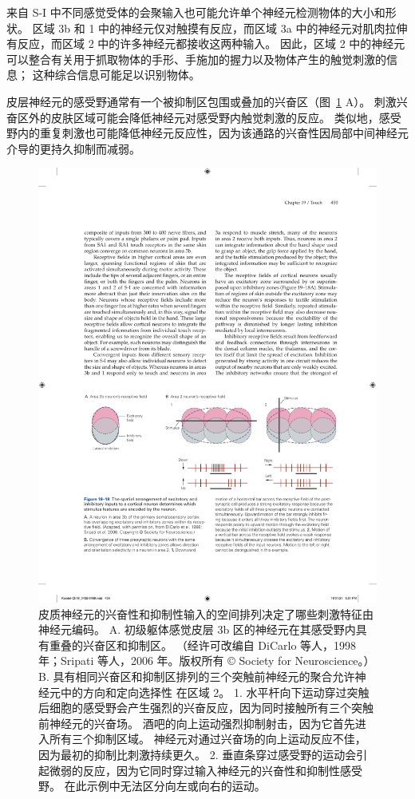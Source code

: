 来自 S-I 中不同感觉受体的会聚输入也可能允许单个神经元检测物体的大小和形状。
区域 3b 和 1 中的神经元仅对触摸有反应，而区域 3a 中的神经元对肌肉拉伸有反应，而区域 2 中的许多神经元都接收这两种输入。
因此，区域 2 中的神经元可以整合有关用于抓取物体的手形、手施加的握力以及物体产生的触觉刺激的信息； 这种综合信息可能足以识别物体。


皮层神经元的感受野通常有一个被抑制区包围或叠加的兴奋区（图~\ref{fig:19_18} A）。
刺激兴奋区外的皮肤区域可能会降低神经元对感受野内触觉刺激的反应。
类似地，感受野内的重复刺激也可能降低神经元反应性，因为该通路的兴奋性因局部中间神经元介导的更持久抑制而减弱。


\begin{figure}[htbp]
	\centering
	\includegraphics[width=1.0\linewidth]{chap19/fig_19_18}
	\caption{皮质神经元的兴奋性和抑制性输入的空间排列决定了哪些刺激特征由神经元编码。
		A. 初级躯体感觉皮层 3b 区的神经元在其感受野内具有重叠的兴奋区和抑制区。 （经许可改编自 DiCarlo 等人，1998 年；Sripati 等人，2006 年。版权所有 © Society for Neuroscience。）
		B. 具有相同兴奋区和抑制区排列的三个突触前神经元的聚合允许神经元中的方向和定向选择性 在区域 2。 
		1. 水平杆向下运动穿过突触后细胞的感受野会产生强烈的兴奋反应，因为同时接触所有三个突触前神经元的兴奋场。
		酒吧的向上运动强烈抑制射击，因为它首先进入所有三个抑制区域。
		神经元对通过兴奋场的向上运动反应不佳，因为最初的抑制比刺激持续更久。
		2. 垂直条穿过感受野的运动会引起微弱的反应，因为它同时穿过输入神经元的兴奋性和抑制性感受野。
		在此示例中无法区分向左或向右的运动。}
	\label{fig:19_18}
\end{figure}


